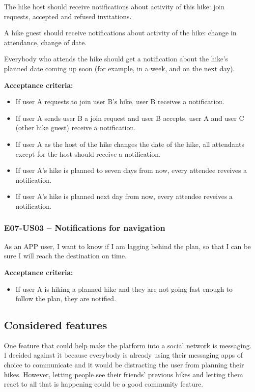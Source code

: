 The hike host should receive notifications about activity of this hike: join requests, accepted and refused invitations.

A hike guest should receive notifications about activity of the hike: change in attendance, change of date.

Everybody who attends the hike should get a notification about the hike's planned date coming up soon (for example, in a week, and on the next day).

\textbf{Acceptance criteria:}
\begin{itemize}
    \item If user A requests to join user B's hike, user B receives a notification.
    \item If user A sends user B a join request and user B accepts, user A and user C (other hike guest) receive a notification.
    \item If user A as the host of the hike changes the date of the hike, all attendants except for the host should receive a notification.
    \item If user A's hike is planned to seven days from now, every attendee reveives a notification.
    \item If user A's hike is planned next day from now, every attendee reveives a notification.
\end{itemize}

\subsubsection*{E07-US03 -- Notifications for navigation}
As an APP user, I want to know if I am lagging behind the plan, so that I can be sure I will reach the destination on time.

\textbf{Acceptance criteria:}
\begin{itemize}
    \item If user A is hiking a planned hike and they are not going fast enough to follow the plan, they are notified.
\end{itemize}


\subsection*{Considered features}
One feature that could help make the platform into a social network is messaging.
I decided against it because everybody is already using their messaging apps of choice to communicate and it would be distracting the user from planning their hikes.
However, letting people see their friends' previous hikes and letting them react to all that is happening could be a good community feature.

